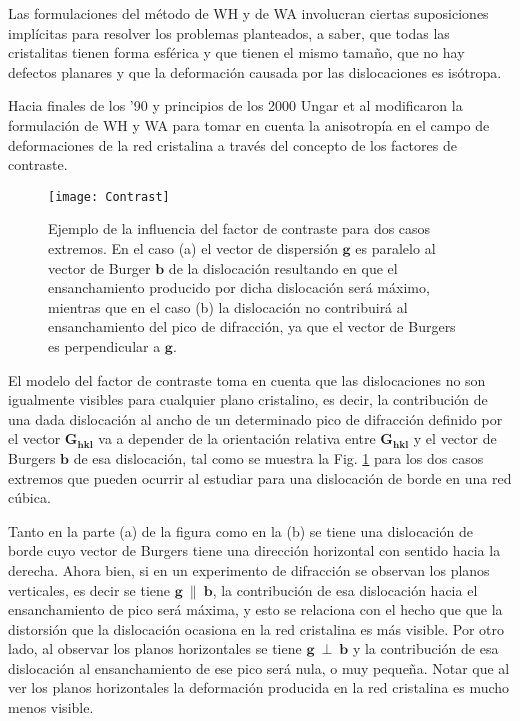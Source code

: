 Las formulaciones del método de WH y de WA involucran ciertas suposiciones implícitas para resolver los problemas planteados, a saber, que todas las cristalitas tienen forma esférica y que tienen el mismo tamaño, que no hay defectos planares y que la deformación causada por las dislocaciones es isótropa. 

Hacia finales de los '90 y principios de los 2000 Ungar et al modificaron la formulación de WH y WA para tomar en cuenta la anisotropía en el campo de deformaciones de la red cristalina a través del concepto de los factores de contraste.

\begin{figure}[!htb]
  \centering
  \texttt{[image: Contrast]}
  \caption{Ejemplo de la influencia del factor de contraste para dos casos extremos. En el caso (a) el vector de dispersión $\mathbf{g}$ es paralelo al vector de Burger $\mathbf{b}$ de la dislocación resultando en que el ensanchamiento producido por dicha dislocación será máximo, mientras que en el caso (b) la dislocación no contribuirá al ensanchamiento del pico de difracción, ya que el vector de Burgers es perpendicular a $\mathbf{g}$.}
  \label{fig:contrast}
\end{figure}

El modelo del factor de contraste toma en cuenta que las dislocaciones no son igualmente visibles para cualquier plano cristalino, es decir, la contribución de una dada dislocación al ancho de un determinado pico de difracción definido por el vector $\mathbf{G_{hkl}}$ va a depender de la orientación relativa entre $\mathbf{G_{hkl}}$ y el vector de Burgers $\mathbf{b}$ de esa dislocación, tal como se muestra la Fig. \ref{fig:contrast} para los dos casos extremos que pueden ocurrir al estudiar para una dislocación de borde en una red cúbica.

Tanto en la parte (a) de la figura como en la (b) se tiene una dislocación de borde cuyo vector de Burgers tiene una dirección horizontal con sentido hacia la derecha. 
Ahora bien, si en un experimento de difracción se observan los planos verticales, es decir se tiene $\mathbf{g} \ \parallel \ \mathbf{b}$, la contribución de esa dislocación hacia el ensanchamiento de pico será máxima, y esto se relaciona con el hecho que que la distorsión que la dislocación ocasiona en la red cristalina es más visible.
Por otro lado, al observar los planos horizontales se tiene $\mathbf{g} \ \perp \ \mathbf{b}$ y la contribución de esa dislocación al ensanchamiento de ese pico será nula, o muy pequeña.
Notar que al ver los planos horizontales la deformación producida en la red cristalina es mucho menos visible.

